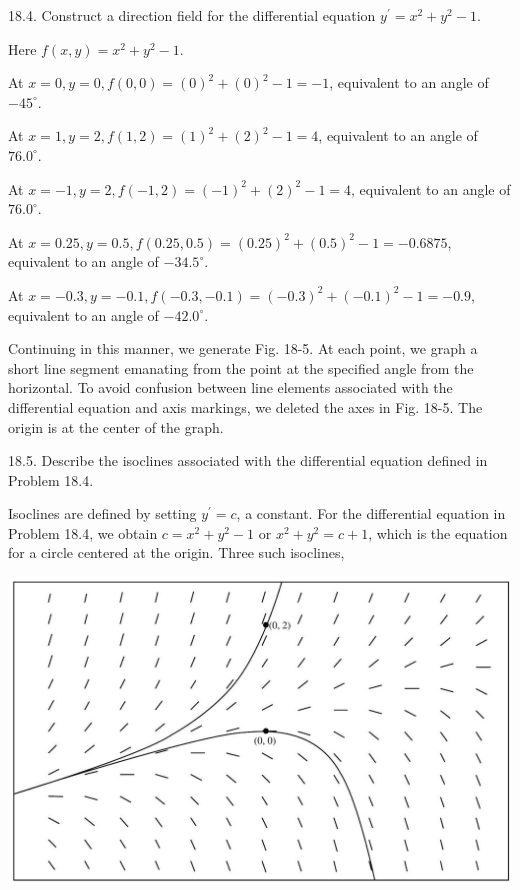 \documentclass[10pt]{article}
\begin{document}
18.4. Construct a direction field for the differential equation $y^{\prime}=x^{2}+y^{2}-1$.

Here $f(x, y)=x^{2}+y^{2}-1$.

At $x=0, y=0, f(0,0)=(0)^{2}+(0)^{2}-1=-1$, equivalent to an angle of $-45^{\circ}$.

At $x=1, y=2, f(1,2)=(1)^{2}+(2)^{2}-1=4$, equivalent to an angle of $76.0^{\circ}$.

At $x=-1, y=2, f(-1,2)=(-1)^{2}+(2)^{2}-1=4$, equivalent to an angle of $76.0^{\circ}$.

At $x=0.25, y=0.5, f(0.25,0.5)=(0.25)^{2}+(0.5)^{2}-1=-0.6875$, equivalent to an angle of $-34.5^{\circ}$.

At $x=-0.3, y=-0.1, f(-0.3,-0.1)=(-0.3)^{2}+(-0.1)^{2}-1=-0.9$, equivalent to an angle of $-42.0^{\circ}$.

Continuing in this manner, we generate Fig. 18-5. At each point, we graph a short line segment emanating from the point at the specified angle from the horizontal. To avoid confusion between line elements associated with the differential equation and axis markings, we deleted the axes in Fig. 18-5. The origin is at the center of the graph.

18.5. Describe the isoclines associated with the differential equation defined in Problem 18.4.

Isoclines are defined by setting $y^{\prime}=c$, a constant. For the differential equation in Problem 18.4, we obtain $c=x^{2}+y^{2}-1$ or $x^{2}+y^{2}=c+1$, which is the equation for a circle centered at the origin. Three such isoclines,

\begin{center}
\includegraphics[max width=\textwidth]{2024_04_03_5bb5b4275a64cb9887d1g-179}
\end{center}
\end{document}
